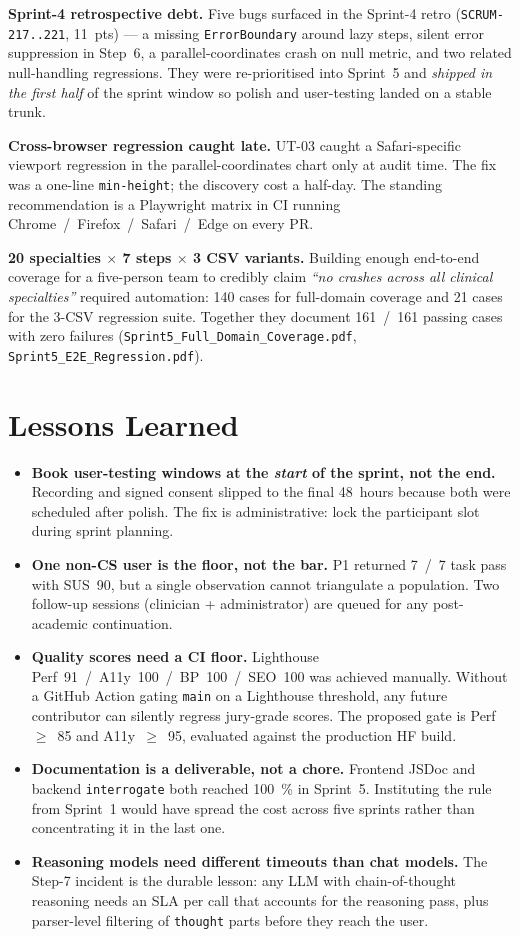 \documentclass[10pt,a4paper,twocolumn]{article}
\begin{document}
\textbf{Sprint-4 retrospective debt.} Five bugs surfaced in the Sprint-4 retro (\texttt{SCRUM-217..221}, 11~pts) --- a missing \texttt{ErrorBoundary} around lazy steps, silent error suppression in Step~6, a parallel-coordinates crash on null metric, and two related null-handling regressions. They were re-prioritised into Sprint~5 and \emph{shipped in the first half} of the sprint window so polish and user-testing landed on a stable trunk.

\textbf{Cross-browser regression caught late.} UT-03 caught a Safari-specific viewport regression in the parallel-coordinates chart only at audit time. The fix was a one-line \texttt{min-height}; the discovery cost a half-day. The standing recommendation is a Playwright matrix in CI running Chrome~/~Firefox~/~Safari~/~Edge on every PR.

\textbf{20 specialties $\times$ 7 steps $\times$ 3 CSV variants.} Building enough end-to-end coverage for a five-person team to credibly claim \emph{``no crashes across all clinical specialties''} required automation: 140 cases for full-domain coverage and 21 cases for the 3-CSV regression suite. Together they document 161~/~161 passing cases with zero failures (\texttt{Sprint5\_Full\_Domain\_Coverage.pdf}, \texttt{Sprint5\_E2E\_Regression.pdf}).

\section{Lessons Learned}
\begin{itemize}[leftmargin=*,itemsep=0.25ex,topsep=0pt]
  \item \textbf{Book user-testing windows at the \emph{start} of the sprint, not the end.} Recording and signed consent slipped to the final 48~hours because both were scheduled after polish. The fix is administrative: lock the participant slot during sprint planning.
  \item \textbf{One non-CS user is the floor, not the bar.} P1 returned 7~/~7 task pass with SUS~90, but a single observation cannot triangulate a population. Two follow-up sessions (clinician + administrator) are queued for any post-academic continuation.
  \item \textbf{Quality scores need a CI floor.} Lighthouse Perf~91~/~A11y~100~/~BP~100~/~SEO~100 was achieved manually. Without a GitHub Action gating \texttt{main} on a Lighthouse threshold, any future contributor can silently regress jury-grade scores. The proposed gate is Perf~$\geq$~85 and A11y~$\geq$~95, evaluated against the production HF build.
  \item \textbf{Documentation is a deliverable, not a chore.} Frontend JSDoc and backend \texttt{interrogate} both reached 100~\% in Sprint~5. Instituting the rule from Sprint~1 would have spread the cost across five sprints rather than concentrating it in the last one.
  \item \textbf{Reasoning models need different timeouts than chat models.} The Step-7 incident is the durable lesson: any LLM with chain-of-thought reasoning needs an SLA per call that accounts for the reasoning pass, plus parser-level filtering of \texttt{thought} parts before they reach the user.
\end{itemize}
\end{document}

